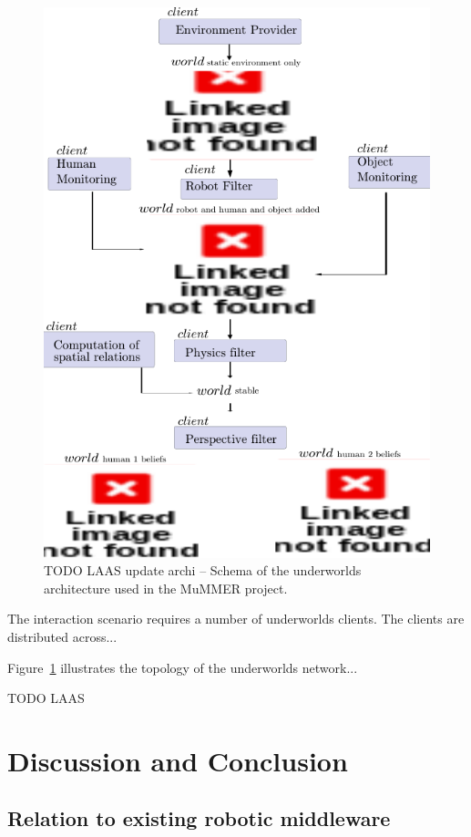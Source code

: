 \documentclass[letterpaper, 10pt, conference]{ieeeconf}
\newcommand{\uwds}{{\sc underworlds}\xspace}
\begin{document}
\begin{figure}
    \centering
    \includegraphics[width=0.9\linewidth]{laasudws}
    \caption{TODO LAAS update archi -- Schema of the \uwds architecture used in
    the MuMMER project. }
    \label{fig|mummerarchitecture}
\end{figure}
The interaction scenario requires a number of \uwds clients. The clients are
distributed across...

Figure~\ref{fig|mummerarchitecture} illustrates the topology of
the \uwds network...

TODO LAAS

\section{Discussion and Conclusion}

\subsection{Relation to existing robotic middleware}
\end{document}
